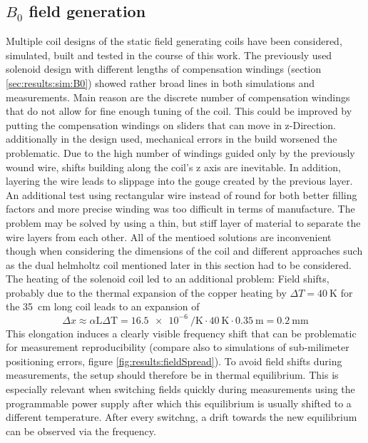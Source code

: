     \subsection{$B_0$ field generation}
    Multiple coil designs of the static field generating coils have been considered, simulated, built and tested in the course of this work. The previously used solenoid design with different lengths of compensation windings (section \ref{sec:results:sim:B0}) showed rather broad lines in both simulations and measurements. Main reason are the discrete number of compensation windings that do not allow for fine enough tuning of the coil. This could be improved by putting the compensation windings on sliders that can move in z-Direction. additionally in the design used, mechanical errors in the build worsened the problematic. Due to the high number of windings guided only by the previously wound wire, shifts building along the coil's z axis are inevitable. In addition, layering the wire leads to slippage into the gouge created by the previous layer. An additional test using rectangular wire instead of round for both better filling factors and more precise winding was too difficult in terms of manufacture. The problem may be solved by using a thin, but stiff layer of material to separate the wire layers from each other. All of the mentioed solutions are inconvenient though when considering the dimensions of the coil and different approaches such as the dual helmholtz coil mentioned later in this section had to be considered.
        The heating of the solenoid coil led to an additional problem: Field shifts, probably due to the thermal expansion of the copper heating by $\Delta T = \SI{40}{\kelvin}$ for the \SI{35}{\centi\meter} long coil leads to an expansion of 
        \begin{equation}
            \Delta x \approx \alpha \mathrm{L}\Delta\mathrm{T}= \SI{16.5e-6}{\per\kelvin}\cdot \SI{40}{\kelvin} \cdot \SI{0.35}{\meter} = \SI{0.2}{\milli\meter}
        \end{equation}
        This elongation induces a clearly visible frequency shift that can be problematic for measurement reproducibility (compare also to simulations of sub-milimeter positioning errors, figure \ref{fig:results:fieldSpread}).
        To avoid field shifts during measurements, the setup should therefore be in thermal equilibrium. This is especially relevant when switching fields quickly during measurements using the programmable power supply after which this equilibrium is usually shifted to a different temperature. After every switchng, a drift towards the new equilibrium can be observed via the frequency.
